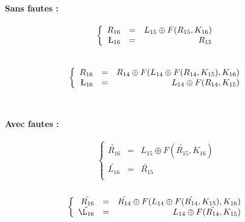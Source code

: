 \documentclass[12pt]{article}
\begin{document}
{        \paragraph{Sans fautes :}
                    \[\left\{
                      \begin{array}{rcr}
                        R_{16}&=&L_{15}\oplus F(R_{15},K_{16}) \\
                        \L_{16}&=&R_{15} \\
                      \end{array}
                    \right.\]\\
                    \[\left\{
                      \begin{array}{rcr}
                        R_{16}&=&R_{14}\oplus F(L_{14}\oplus F(R_{14},K_{15}),K_{16}) \\
                        \L_{16}&=&L_{14}\oplus F(R_{14},K_{15}) \\
                      \end{array}
                    \right.\]\\
                    \newpage
        \paragraph{Avec fautes :}
                    \[\left\{
                      \begin{array}{rcr}
                        \tilde{R_{16}}&=&L_{15}\oplus F(\tilde{R_{15}},K_{16}) \\
                        \tilde{L_{16}}&=&\tilde{R_{15}} \\
                      \end{array}
                    \right.\]\\
                     \[\left\{
                      \begin{array}{rcr}
                        \tilde{R_{16}}&=&\tilde{R_{14}}\oplus F(L_{14}\oplus F(\tilde{R_{14}},K_{15}),K_{16}) \\
                        \tilde{\L_{16}}&=&L_{14}\oplus F(\tilde{R_{14}},K_{15}) \\
                      \end{array}
                    \right.\]\\
                    
}
\end{document}
